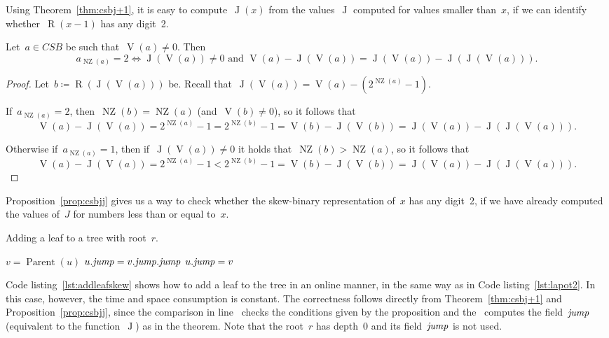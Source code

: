 \documentclass[main.tex]{subfiles}
\newcommand{\Par}{\operatorname{Parent}}
\newcommand{\Dep}{\operatorname{D}}
\newcommand{\NZ}{\operatorname{NZ}}
\newcommand{\CSB}{\textit{CSB}}
\renewcommand{\V}{\operatorname{V}}
\newcommand{\R}{\operatorname{R}}
\newcommand{\J}{\operatorname{J}}
\begin{document}
Using Theorem~\ref{thm:csbj+1}, it is easy to compute~$\J(x)$ from the values~$\J$ computed for values smaller than~$x$, if we can identify whether~$\R(x - 1)$ has any digit~2.

\begin{proposition} \label{prop:csbjj}
	Let~$a \in \CSB$ be such that~$\V(a) \neq 0$. Then \vspace{-2ex}
	$${a_{\NZ(a)} = 2 \iff \J(\V(a)) \neq 0 \text{ and } \V(a) - \J(\V(a)) = \J(\V(a)) - \J(\J(\V(a))).}$$
\end{proposition}
\begin{proof}
	Let~$b \coloneqq \R(\J(\V(a)))$ be. Recall that~${\J(\V(a)) = \V(a) - (2^{\NZ(a)} - 1)}$.

	If~${a_{\NZ(a)} = 2}$, then~$\NZ(b) = \NZ(a)$ (and~$\V(b) \neq 0$), so it follows that~$$\V(a) - \J(\V(a)) = 2^{\NZ(a)} - 1 = 2^{\NZ(b)} - 1 = \V(b) - \J(\V(b)) = \J(\V(a)) - \J(\J(\V(a))).$$

	Otherwise if~$a_{\NZ(a)} = 1$, then if~$\J(\V(a)) \neq 0$ it holds that~$\NZ(b) > \NZ(a)$, so it follows that~$$\V(a) - \J(\V(a)) = 2^{\NZ(a)} - 1 < 2^{\NZ(b)} - 1 = \V(b) - \J(\V(b)) = \J(\V(a)) - \J(\J(\V(a))).$$
\end{proof}

Proposition~\ref{prop:csbjj} gives us a way to check whether the skew-binary representation of~$x$ has any digit~2, if we have already computed the values of~$J$ for numbers less than or equal to~$x$.

\renewcommand{\root}{\mathit{root}}
\begin{algorithm}[h]
\caption{Adding a leaf to a tree with root~$r$.} \label{lst:addleafskew}
\begin{algorithmic}[1]
		\State $v = \Par(u)$
		\If{$v.\jmp \neq r \textbf{ and } \Dep(v) - \Dep(v.\jmp) = \Dep(v.\jmp) - \Dep(v.\jmp.\jmp)$} \label{lst:addleafskew:if}
			\State $u.\mathit{jump} = v.\mathit{jump}.\mathit{jump}$
		\Else
			\State $u.\mathit{jump} = v$
		\EndIf
	\EndFunction
\end{algorithmic}
\end{algorithm}

Code listing~\ref{lst:addleafskew} shows how to add a leaf to the tree in an online manner, in the same way as in Code listing~\ref{lst:lapot2}. In this case, however, the time and space consumption is constant. The correctness follows directly from Theorem~\ref{thm:csbj+1} and Proposition~\ref{prop:csbjj}, since the comparison in line~ checks the conditions given by the proposition and the~ computes the field~$\mathit{jump}$ (equivalent to the function~$\J$) as in the theorem. Note that the root~$r$ has depth~0 and its field~$\mathit{jump}$ is not used.
\end{document}
